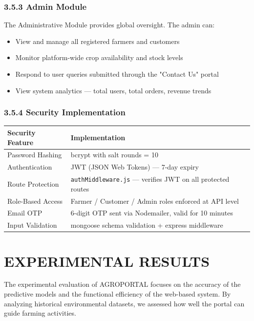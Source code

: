\documentclass[12pt,a4paper]{report}
\begin{document}
\subsection{3.5.3 Admin Module}

The Administrative Module provides global oversight. The admin can:

\begin{itemize}
\item View and manage all registered farmers and customers
\item Monitor platform-wide crop availability and stock levels
\item Respond to user queries submitted through the "Contact Us" portal
\item View system analytics — total users, total orders, revenue trends
\end{itemize}
\subsection{3.5.4 Security Implementation}

\begin{table}[h!]
\centering
\begin{tabular}{|l|l|}
\hline
Security Feature & Implementation \\ \hline
Password Hashing & bcrypt with salt rounds = 10 \\ \hline
Authentication & JWT (JSON Web Tokens) — 7-day expiry \\ \hline
Route Protection & \texttt{authMiddleware.js} — verifies JWT on all protected routes \\ \hline
Role-Based Access & Farmer / Customer / Admin roles enforced at API level \\ \hline
Email OTP & 6-digit OTP sent via Nodemailer, valid for 10 minutes \\ \hline
Input Validation & mongoose schema validation + express middleware \\ \hline
\end{tabular}
\end{table}

\newpage

\chapter{EXPERIMENTAL RESULTS}

The experimental evaluation of AGROPORTAL focuses on the accuracy of the predictive models and the functional efficiency of the web-based system. By analyzing historical environmental datasets, we assessed how well the portal can guide farming activities.
\end{document}
